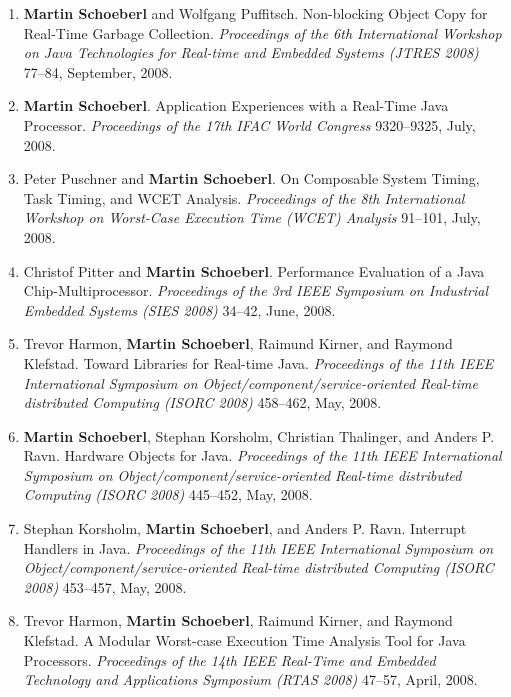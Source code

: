 \begin{enumerate}
\item {\bf Martin Schoeberl} and Wolfgang Puffitsch.
 Non-blocking Object Copy for Real-Time Garbage Collection.
 \emph{Proceedings of the 6th International Workshop on Java Technologies for Real-time and Embedded Systems (JTRES 2008)} 77--84, September, 2008.

\item {\bf Martin Schoeberl}.
 Application Experiences with a Real-Time Java Processor.
 \emph{Proceedings of the 17th IFAC World Congress} 9320--9325, July, 2008.

\item Peter Puschner and {\bf Martin Schoeberl}.
 On Composable System Timing, Task Timing, and WCET Analysis.
 \emph{Proceedings of the 8th International Workshop on Worst-Case Execution Time (WCET) Analysis} 91--101, July, 2008.

\item Christof Pitter and {\bf Martin Schoeberl}.
 Performance Evaluation of a Java Chip-Multiprocessor.
 \emph{Proceedings of the 3rd IEEE Symposium on Industrial Embedded Systems (SIES 2008)} 34--42, June, 2008.

\item Trevor Harmon, {\bf Martin Schoeberl}, Raimund Kirner, and Raymond Klefstad.
 Toward Libraries for Real-time Java.
 \emph{Proceedings of the 11th IEEE International Symposium on Object/component/service-oriented Real-time distributed Computing (ISORC 2008)} 458--462, May, 2008.

\item {\bf Martin Schoeberl}, Stephan Korsholm, Christian Thalinger, and Anders P. Ravn.
 Hardware Objects for Java.
 \emph{Proceedings of the 11th IEEE International Symposium on Object/component/service-oriented Real-time distributed Computing (ISORC 2008)} 445--452, May, 2008.

\item Stephan Korsholm, {\bf Martin Schoeberl}, and Anders P. Ravn.
 Interrupt Handlers in Java.
 \emph{Proceedings of the 11th IEEE International Symposium on Object/component/service-oriented Real-time distributed Computing (ISORC 2008)} 453--457, May, 2008.

\item Trevor Harmon, {\bf Martin Schoeberl}, Raimund Kirner, and Raymond Klefstad.
 A Modular Worst-case Execution Time Analysis Tool for Java Processors.
 \emph{Proceedings of the 14th IEEE Real-Time and Embedded Technology and Applications Symposium (RTAS 2008)} 47--57, April, 2008.



\end{enumerate}
